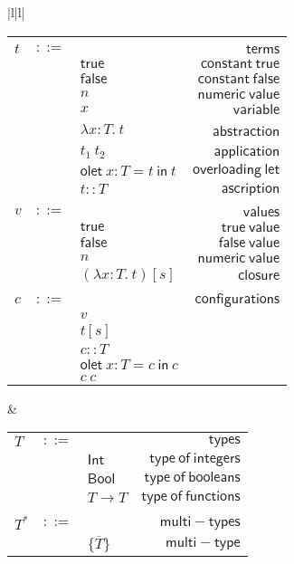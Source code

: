 \documentclass[preprint,authoryear,sort&compress,9pt,nocopyrightspace]{article}
\newcommand{\conf}[2][s]{(#2)[#1]}
\newcommand{\ascrip}[1]{#1::T}
\newcommand{\oletD}{\mathsf{olet} \ x : T = t \ \mathsf{in}  \ t}
\newcommand{\oletP}[3]{\mathsf{olet} \ x : #1 = #2 \ \mathsf{in}  \ #3}
\newcommand{\app}[2]{#1 \ #2}
\newcommand{\abs}[3]{\lambda #1:#2. \ #3}
\newcommand{\truet}{\mathsf{true}}
\newcommand{\falset}{\mathsf{false}}
\newcommand{\boolt}{\mathsf{Bool}}
\newcommand{\intt}{\mathsf{Int}}
\newcommand{\mtP}[1]{#1^{*}}
\newcommand{\mtC}[1]{\{\overline {#1}\}}
\begin{document}
\begin{figure}
\begin{small}
\begin{center}
\begin{tabular}{|l|l|}
\hline
\begin{tabular}{l c l r}
&&&\\
$t$&$::=$&&$\mathsf {terms}$\\
&&$\truet$&$\mathsf {constant \ true}$\\
&&$\falset$&$\mathsf {constant \ false}$\\
&&$n$&$\mathsf {numeric \ value}$\\
&&$x$&$\mathsf {variable}$\\
&&$\abs {x}{T}{t}$&\ $\mathsf {abstraction}$\\
&&$\app {t_1}{t_2}$&$\mathsf {application}$\\
&&$\oletD$&$\mathsf {overloading \ let}$\\
&&$\ascrip {t}$&$\mathsf {ascription}$\\
&&&\\
$v$&$::=$&&$\mathsf {values}$\\
&&$\truet$&$\mathsf {true \ value}$\\
&&$\falset$&$\mathsf {false \ value}$\\
&&$n$&$\mathsf {numeric \ value}$\\
&&$\conf {\abs {x}{T}{t}}$&$\mathsf {closure}$\\
&&&\\
$c$&$::=$&&$\mathsf {configurations}$\\
&&$v$&\\
&&$t[s]$&\\
&&$\ascrip{c}$&\\
&&$\oletP {T}{c}{c}$&\\
&&$c \ c $&\\
\end{tabular}
& \begin{tabular}{l c l r}
$T$&$::=$&&$\mathsf {types}$\\
&&$\intt$&$\mathsf {type \ of \ integers}$\\
&&$\boolt$&$\mathsf {type \ of \ booleans}$\\
&&$T \to T$&$\mathsf {type \ of \ functions}$\\
&&&\\
$\mtP{T}$&$::=$&&$\mathsf {multi-types}$\\
&&$\mtC{T}$&$\mathsf {multi-type}$\\

\end{tabular}
\end{tabular}
\end{center}
\end{small}
\end{figure}
\end{document}
